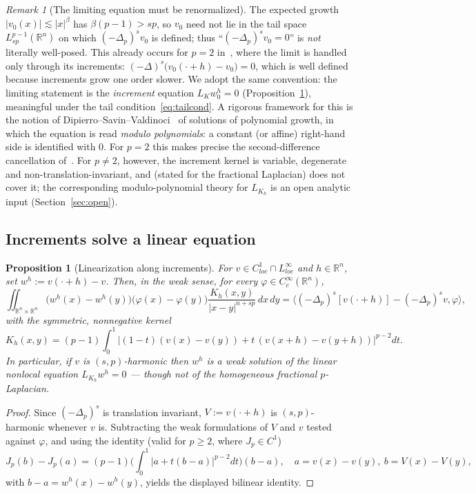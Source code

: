 \documentclass[11pt]{amsart}
\theoremstyle{plain}
\newtheorem{proposition}[theorem]{Proposition}
\theoremstyle{definition}
\theoremstyle{remark}
\newtheorem{remark}[theorem]{Remark}
\newcommand{\R}{\mathbb{R}}
\newcommand{\fpl}[1]{(-\Delta_p)^{s}#1}
\begin{document}
\begin{remark}[The limiting equation must be renormalized]\label{rem:renorm}
The expected growth $|v_0(x)|\lesssim|x|^{\beta}$ has $\beta(p-1)>sp$, so $v_0$
need not lie in the tail space $L^{p-1}_{sp}(\R^n)$ on which $\fpl{v_0}$ is
defined; thus ``$\fpl{v_0}=0$'' is \emph{not} literally well-posed. This
already occurs for $p=2$ in~\cite{PTU}, where the limit is handled only through
its increments: $(-\Delta)^s\big(v_0(\cdot+h)-v_0\big)=0$, which is well defined
because increments grow one order slower. We adopt the same convention: the
limiting statement is the \emph{increment} equation $L_{K}w_0^h=0$
(Proposition~\ref{prop:linincr}), meaningful under the tail
condition~\eqref{eq:tailcond}. A rigorous framework for this is the notion of
Dipierro--Savin--Valdinoci~\cite{DSV} of solutions of polynomial growth, in
which the equation is read \emph{modulo polynomials}: a constant (or affine)
right-hand side is identified with $0$. For $p=2$ this makes precise the
second-difference cancellation of~\cite{PTU}. For $p\neq2$, however, the
increment kernel is variable, degenerate and non-translation-invariant, and
\cite{DSV} (stated for the fractional Laplacian) does not cover it; the
corresponding modulo-polynomial theory for $L_{K_h}$ is an open analytic input
(Section~\ref{sec:open}).
\end{remark}

\subsection{Increments solve a linear equation}
\begin{proposition}[Linearization along increments]\label{prop:linincr}
For $v\in C^1_{loc}\cap L^\infty_{loc}$ and $h\in\R^n$, set $w^h:=v(\cdot+h)-v$.
Then, in the weak sense, for every $\varphi\in C^\infty_c(\R^n)$,
\[
  \iint_{\R^n\times\R^n}\big(w^h(x)-w^h(y)\big)\big(\varphi(x)-\varphi(y)\big)
   \frac{K_h(x,y)}{|x-y|^{n+sp}}\,dx\,dy
   = \langle\fpl{[v(\cdot+h)]}-\fpl{v},\varphi\rangle,
\]
with the \emph{symmetric, nonnegative} kernel
\[
  K_h(x,y)=(p-1)\int_0^1\big|(1-t)(v(x)-v(y))+t\,(v(x+h)-v(y+h))\big|^{p-2}dt .
\]
In particular, if $v$ is $(s,p)$-harmonic then $w^h$ is a weak solution of the
\emph{linear} nonlocal equation $L_{K_h}w^h=0$ --- though not of the
homogeneous fractional $p$-Laplacian.
\end{proposition}
\begin{proof}
Since $\fpl{}$ is translation invariant, $V:=v(\cdot+h)$ is $(s,p)$-harmonic
whenever $v$ is. Subtracting the weak formulations of $V$ and $v$ tested
against $\varphi$, and using the identity (valid for $p\ge2$, where $J_p\in
C^1$)
\[
  J_p(b)-J_p(a)=(p-1)\Big(\int_0^1|a+t(b-a)|^{p-2}dt\Big)(b-a),\quad
  a=v(x)-v(y),\ b=V(x)-V(y),
\]
with $b-a=w^h(x)-w^h(y)$, yields the displayed bilinear identity.
\end{proof}
\end{document}
